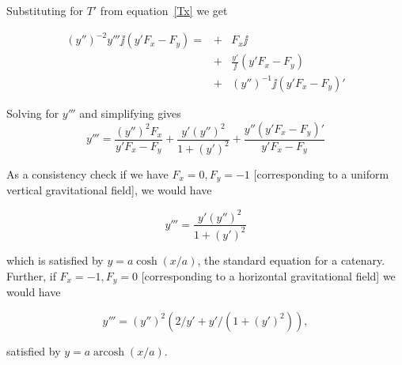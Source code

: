 \documentclass{article}
\begin{document}
Substituting for $T'$ from equation~\ref{Tx} we get

\begin{eqnarray}
  (y'')^{-2}y'''\jj(y'F_x-F_y)=&+&F_x\jj\nonumber\\
  &+&\frac{y'}{\jj}(y'F_x-F_y)\\
  &+&(y'')^{-1}\jj(y'F_x -F_y)'\nonumber
\end{eqnarray}
  

Solving for $y'''$ and simplifying gives
\begin{equation}
  y'''=\frac{(y'')^2F_x}{y'F_x-F_y}
  + \frac{y'(y'')^2}{1+(y')^2}
  + \frac{y''(y'F_x-F_y)'}{y'F_x-F_y}
\end{equation}

As a consistency check if we have $F_x=0,F_y=-1$ [corresponding to a
  uniform vertical gravitational field], we would have

\begin{equation}
  y'''=\frac{y'(y'')^2}{1+(y')^2}
\end{equation}

which is satisfied by $y=a\cosh(x/a)$, the standard equation for a
catenary.  Further, if $F_x=-1,F_y=0$ [corresponding to a horizontal
  gravitational field] we would have

\begin{equation}
  y''' = (y'')^2(2/y'+y'/(1+(y')^2)),
\end{equation}

satisfied by $y=a\operatorname{arcosh}(x/a)$.





\end{document}
